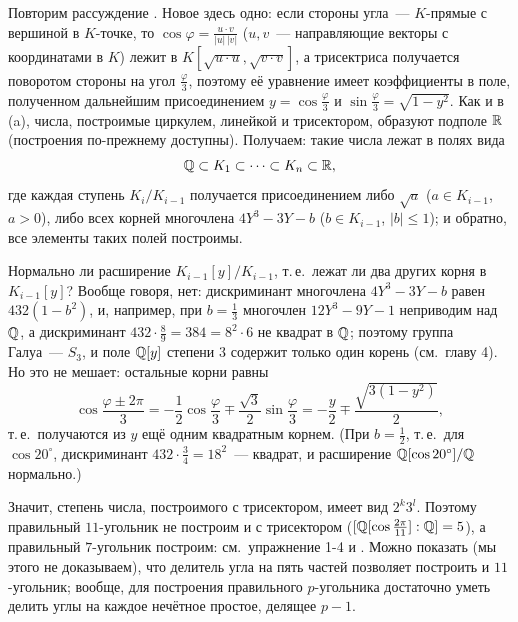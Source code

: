 \begin{aside}
Повторим рассуждение .
Новое здесь одно: если стороны угла~--- $K$-прямые с вершиной в $K$-точке, то
$\cos\varphi=\frac{u\cdot v}{|u|\,|v|}$ ($u,v$~--- направляющие векторы с координатами в $K$) лежит в
$K[\sqrt{u\cdot u},\sqrt{v\cdot v}]$, а трисектриса получается поворотом стороны на угол $\frac\varphi3$, поэтому её
уравнение имеет коэффициенты в поле, полученном дальнейшим присоединением $y=\cos\frac\varphi3$ и
$\sin\frac\varphi3=\sqrt{1-y^2}$. Как и в (a), числа, построимые циркулем, линейкой и трисектором, образуют
подполе $\mathbb R$ (построения  по-прежнему доступны). Получаем: такие числа лежат в полях вида
\[
\mathbb Q\subset K_1\subset\dots\subset K_n\subset\mathbb R,
\]
где каждая ступень $K_i/K_{i-1}$ получается присоединением либо $\sqrt a$ ($a\in K_{i-1}$, $a>0$), либо всех корней
многочлена $4Y^3-3Y-b$ ($b\in K_{i-1}$, $|b|\le1$); и обратно, все элементы таких полей построимы.

Нормально ли расширение $K_{i-1}[y]/K_{i-1}$, т.\,е.\ лежат ли два других корня в $K_{i-1}[y]$? Вообще говоря, нет:
дискриминант многочлена $4Y^3-3Y-b$ равен $432(1-b^2)$, и, например, при $b=\frac13$ многочлен $12Y^3-9Y-1$ неприводим над
$\mathbb Q$, а дискриминант $432\cdot\frac89=384=8^2\cdot6$ не квадрат в $\mathbb Q$; поэтому группа Галуа~--- $S_3$, и поле $\mathbb Q[y]$
степени $3$ содержит только один корень (см.\ главу 4). Но это не мешает: остальные корни равны
\[
\cos\frac{\varphi\pm2\pi}3=-\frac12\cos\frac\varphi3\mp\frac{\sqrt3}2\sin\frac\varphi3=-\frac y2\mp\frac{\sqrt{3(1-y^2)}}2,
\]
т.\,е.\ получаются из $y$ ещё одним квадратным корнем. (При $b=\frac12$, т.\,е.\ для $\cos20^\circ$, дискриминант
$432\cdot\frac34=18^2$~--- квадрат, и расширение $\mathbb Q[\cos20^\circ]/\mathbb Q$ нормально.)

Значит, степень числа, построимого с трисектором, имеет вид $2^k3^l$. Поэтому правильный $11$-угольник не построим и
с трисектором ($[\mathbb Q[\cos\frac{2\pi}{11}]:\mathbb Q]=5$), а правильный $7$-угольник построим: см.\ упражнение 1-4 и .
Можно показать (мы этого не доказываем), что делитель угла на пять частей позволяет построить и $11$-угольник; вообще,
для построения правильного $p$-угольника достаточно уметь делить углы на каждое нечётное простое, делящее $p-1$.


\end{aside}
